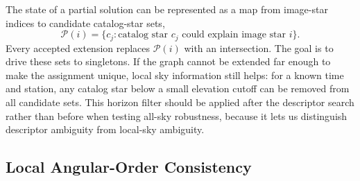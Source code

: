 \documentclass[11pt]{article}
\begin{document}
The state of a partial solution can be represented as a map from image-star
indices to candidate catalog-star sets,
\begin{equation}
  \mathcal{P}(i) = \{c_j: \text{catalog star } c_j
  \text{ could explain image star } i\}.
\end{equation}
Every accepted extension replaces \(\mathcal{P}(i)\) with an intersection.
The goal is to drive these sets to singletons. If the graph cannot be extended
far enough to make the assignment unique, local sky information still helps:
for a known time and station, any catalog star below a small elevation cutoff
can be removed from all candidate sets. This horizon filter should be applied
after the descriptor search rather than before when testing all-sky robustness,
because it lets us distinguish descriptor ambiguity from local-sky ambiguity.

\subsection{Local Angular-Order Consistency}
\end{document}
